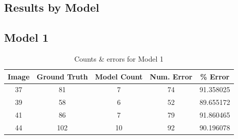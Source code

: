 
\begin{appendices}

\section{Results by Model}
\subsection{Model 1}

\begin{table}[h!]
\centering
\begin{tabular}{||c c c c c||} 
\hline
Image &  Ground Truth &  Model Count &  Num. Error &    \% Error \\
\hline\hline
37 &            81 &            7 &          74 &  91.358025 \\
39 &            58 &            6 &          52 &  89.655172 \\
41 &            86 &            7 &          79 &  91.860465 \\
44 &           102 &           10 &          92 &  90.196078 \\
\hline
\end{tabular}
\caption{Counts \& errors for Model 1}
\label{count_1}
\end{table}


\end{appendices}
